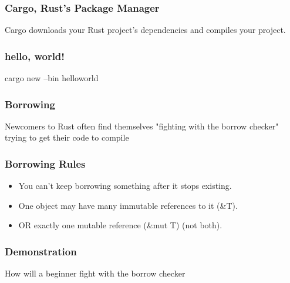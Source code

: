 \documentclass[11pt]{beamer}
\begin{document}
\begin{frame}
\frametitle{Cargo, Rust’s Package Manager}
Cargo downloads your Rust project’s dependencies and compiles your project.
\end{frame}

\begin{frame}
\frametitle{hello, world!}
cargo new --bin helloworld
\end{frame}

\begin{frame}
\frametitle{Borrowing}
Newcomers to Rust often find themselves "fighting with the borrow checker"
trying to get their code to compile
\end{frame}

\begin{frame}
\frametitle{Borrowing Rules}
\begin{itemize}
\item You can't keep borrowing something after it stops existing.
\item One object may have many immutable references to it (\&T).
\item OR exactly one mutable reference (\&mut T) (not both).
\end{itemize}
\end{frame}

\begin{frame}
\frametitle{Demonstration}
How will a beginner fight with the borrow checker
\end{frame}
\end{document}
